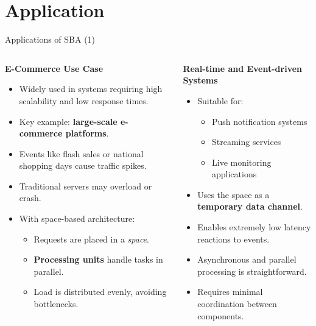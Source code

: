 \documentclass[aspectratio=169, table]{beamer}
\begin{document}
	\section{Application}
	
	\begin{frame}{Applications of SBA (1)}
		\vspace{20pt}
		\begin{columns}[t]
			\begin{column}{0.55\textwidth}
				\textbf{E-Commerce Use Case}
				\begin{itemize}
					\item Widely used in systems requiring high scalability and low response times.
					\item Key example: \textbf{large-scale e-commerce platforms}.
					\item Events like flash sales or national shopping days cause traffic spikes.
					\item Traditional servers may overload or crash.
					\item With space-based architecture:
					\begin{itemize}
						\item Requests are placed in a \textit{space}.
						\item \textbf{Processing units} handle tasks in parallel.
						\item Load is distributed evenly, avoiding bottlenecks.
					\end{itemize}
				\end{itemize}
			\end{column}
			
			\begin{column}{0.45\textwidth}
				\textbf{Real-time and Event-driven Systems}
				\begin{itemize}
					\item Suitable for:
					\begin{itemize}
						\item Push notification systems
						\item Streaming services
						\item Live monitoring applications
					\end{itemize}
					\item Uses the space as a \textbf{temporary data channel}.
					\item Enables extremely low latency reactions to events.
					\item Asynchronous and parallel processing is straightforward.
					\item Requires minimal coordination between components.
				\end{itemize}
			\end{column}
		\end{columns}
	\end{frame}
	
\end{document}
